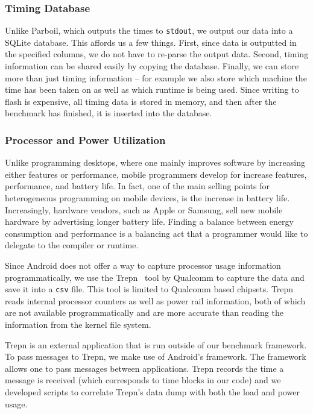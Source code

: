 \subsubsection{Timing Database}

Unlike Parboil, which outputs the times to {\tt stdout}, we output our data into
a SQLite database.  This affords us a few things.  First, since data is
outputted in the specified columns, we do not have to re-parse the output data.
Second, timing information can be shared easily by copying the database.
Finally, we can store more than just timing information -- for example we also
store which machine the time has been taken on as well as which runtime is being
used.  Since writing to flash is expensive, all timing data is stored in memory,
and then after the benchmark has finished, it is inserted into the database. 

\subsubsection{Processor and Power Utilization}

Unlike programming desktops, where one mainly 
  improves software by increasing either features or performance,
  mobile programmers develop for increase features, performance, and 
  battery life.
In fact, one of the main selling points for heterogeneous
  programming on mobile devices, is the increase in battery life.
Increasingly, hardware vendors, such as Apple or Samsung, sell new
  mobile hardware by advertising longer battery life.
Finding a balance between energy consumption and performance is a 
  balancing act that a programmer would like to delegate to the 
  compiler or runtime.

Since Android does not offer a way to capture processor usage information
programmatically, we use the Trepn~\cite{profilerqualcomm} tool by Qualcomm to capture the data and save it into a {\tt csv} file.
This tool is limited to Qualcomm based
chipsets. Trepn reads internal processor counters as well as power rail information,
both of which are not available programmatically and are more accurate than reading
the information from the  kernel file system.

Trepn is an external application that is run outside of our benchmark framework.
To pass messages to Trepn, we make use of Android's  framework.
The  framework allows one to pass messages between applications.
Trepn records the time a message is received (which corresponds to time blocks
in our code) and we developed scripts to correlate Trepn's data dump with both
the load and power usage.

